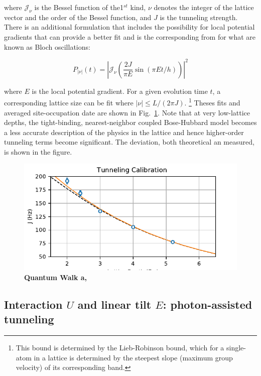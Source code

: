 where $\mathcal{J}_\nu$ is the Bessel function of the1$^{st}$ kind, $\nu$ denotes the integer of the lattice vector and the order of the Bessel function, and $J$ is the tunneling strength. There is an additional formulation that includes the possibility for local potential gradients that can provide a better fit and is the corresponding from for what are known as Bloch oscillations:

\begin{equation}
\label{eqn:BlochOsc}
P_{|\nu|}(t)= \left | \mathcal{J}_\nu \left (  \frac{2 J}{\pi E} \sin \left( {\pi E t / h}\right ) \right ) \right |^2
\end{equation}

where $E$ is the local potential gradient. For a given evolution time $t$, a corresponding lattice size can be fit where $ |\nu| \leq L/(2 \pi J) $. \footnote{This bound is determined by the Lieb-Robinson bound, which for a single-atom in a lattice is determined by the steepest slope (maximum group velocity) of its corresponding band.} Theses fits and averaged site-occupation date are shown in Fig.~\ref{fig:QWCal}. Note that at very low-lattice depths, the tight-binding, nearest-neighbor coupled Bose-Hubbard model becomes a less accurate description of the physics in the lattice and hence higher-order tunneling terms become significant. The deviation, both theoretical an measured, is shown in the figure.

\begin{figure}[h!]
		\includegraphics[width=3.5 in ]{figures/ch2/QW_cal/QWCal.pdf} 
		\caption{\textbf{Quantum Walk a,}   }
		\label{fig:QWCal}	
\end{figure}



\subsection{Interaction $U$ and linear tilt $E$: photon-assisted tunneling} \label{sec:EUcal}

